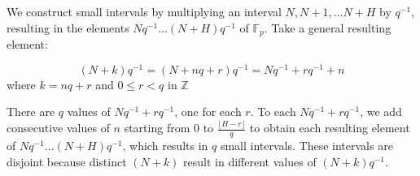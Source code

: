 \documentclass{report}
\begin{document}
We construct small intervals by multiplying an interval $N,N+1,...N+H$ by $q^{-1}$, resulting in the elements $Nq^{-1}...(N+H)q^{-1}$ of $\mathbb{F}_p$. Take a general resulting element:

$$(N+k)q^{-1}=(N+nq+r)q^{-1}=Nq^{-1}+rq^{-1}+n$$
where $k=nq+r$ and $0\leq r<q$ in $\mathbb{Z}$

There are $q$ values of $Nq^{-1}+rq^{-1}$, one for each $r$. To each $Nq^{-1}+rq^{-1}$, we add consecutive values of $n$ starting from $0$ to $\frac{\lfloor H-r\rfloor}{q}$ to obtain each resulting element of $Nq^{-1}...(N+H)q^{-1}$, which results in $q$ small intervals. These intervals are disjoint because distinct $(N+k)$ result in different values of $(N+k)q^{-1}$.

\begin{comment}
   Now, how do we arithmetically calculate the exact values of an interval $(N+r)q^{-1},(N+r)q^{-1}+1...(N+r)q^{-1}+\frac{\lfloor H-r\rfloor}{q}$? Since we are dealing with elements in $\mathbb{F}_p$, $N+r\equiv N+r+tp (mod\text{ }p), t\in \mathbb{Z}$. For exactly one $t\in\{0, 1, q-1\}$ for each $r$, $N+r+tp\divides q$, which makes $\frac{N+r+tp}{q}$ an integer. Thus the intervals translate to integers between
\end{comment}
\end{document}
